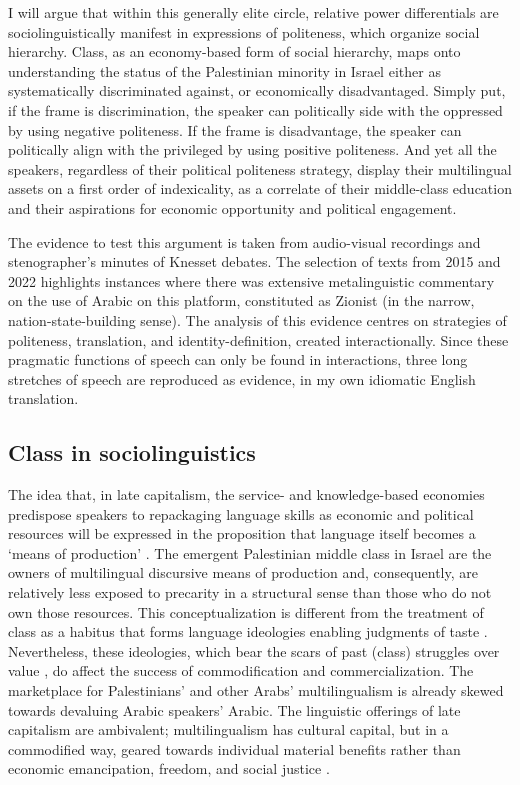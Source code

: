 \documentclass[output=paper,arabicfont]{langscibook}
\begin{document}
I will argue that within this generally elite circle, relative power differentials are sociolinguistically manifest in expressions of politeness, which organize social hierarchy. Class, as an economy-based form of social hierarchy, maps onto understanding the status of the Palestinian minority in Israel either as systematically discriminated against, or economically disadvantaged. Simply put, if the frame is discrimination, the speaker can politically side with the oppressed by using negative politeness. If the frame is disadvantage, the speaker can politically align with the privileged by using positive politeness. And yet all the speakers, regardless of their political politeness strategy, display their multilingual assets on a first order of indexicality, as a correlate of their middle-class education and their aspirations for economic opportunity and political engagement.

\largerpage
The evidence to test this argument is taken from audio-visual recordings and stenographer’s minutes of Knesset debates. The selection of texts from 2015 and 2022 highlights instances where there was extensive metalinguistic commentary on the use of Arabic on this platform, constituted as Zionist (in the narrow, nation-state-building sense). The analysis of this evidence centres on strategies of politeness, translation, and identity-definition, created interactionally. Since these pragmatic functions of speech can only be found in interactions, three long stretches of speech are reproduced as evidence, in my own idiomatic English translation.

\subsection{Class in sociolinguistics}

\largerpage
The idea that, in late capitalism, the service- and knowledge-based economies predispose speakers to repackaging language skills as economic and political resources will be expressed in the proposition that language itself becomes a ‘means of production' \citep{heller2017a}. The emergent Palestinian middle class in Israel are the owners of multilingual discursive means of production and, consequently, are relatively less exposed to precarity in a structural sense than those who do not own those resources. This conceptualization is different from the treatment of class as a habitus that forms language ideologies enabling judgments of taste \citep{bourdieu1982a}. Nevertheless, these ideologies, which bear the scars of past (class) struggles over value \citep[892]{myles1999a}, do affect the success of commodification and commercialization. The marketplace for Palestinians’ and other Arabs’ multilingualism is already skewed towards devaluing Arabic speakers’ Arabic. The linguistic offerings of late capitalism are ambivalent; multilingualism has cultural capital, but in a commodified way, geared towards individual material benefits rather than economic emancipation, freedom, and social justice \citep{davis2008a}.
\end{document}
